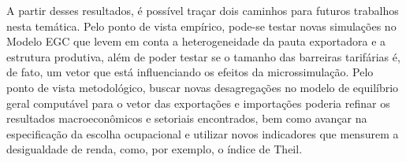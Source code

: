 A partir desses resultados, é possível traçar dois caminhos para futuros trabalhos nesta temática. Pelo ponto de vista empírico, pode-se testar novas simulações no Modelo EGC que levem em conta a heterogeneidade da pauta exportadora e a estrutura produtiva, além de poder testar se o tamanho das barreiras tarifárias é, de fato, um vetor que está influenciando os efeitos da microssimulação. Pelo ponto de vista metodológico, buscar novas desagregações no modelo de equilíbrio geral computável para o vetor das exportações e importações poderia refinar os resultados macroeconômicos e setoriais encontrados, bem como avançar na especificação da escolha ocupacional e utilizar novos indicadores que mensurem a desigualdade de renda, como, por exemplo, o índice de Theil.


